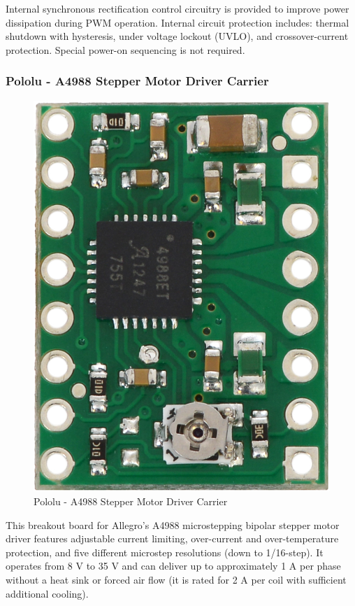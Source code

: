 Internal synchronous rectification control circuitry is provided to improve power dissipation during PWM operation. Internal circuit protection includes: thermal shutdown with hysteresis, under voltage lockout (UVLO), and crossover-current protection. Special power-on sequencing is not required\cite{A4988_allegro_thesis}.

\subsubsection{Pololu - A4988 Stepper Motor Driver Carrier}
\begin{figure}[H]
	\centering
	\includegraphics[width=\maxwidth{8cm}, keepaspectratio]{Chapters/Fig/pololu_A4988.jpg}
	\caption{Pololu - A4988 Stepper Motor Driver Carrier}
	\label{fig:pololu_A4988}
\end{figure}
This breakout board for Allegro's A4988 microstepping bipolar stepper motor driver features adjustable current limiting, over-current and over-temperature protection, and five different microstep resolutions (down to 1/16-step). It operates from 8 V to 35 V and can deliver up to approximately 1 A per phase without a heat sink or forced air flow (it is rated for 2 A per coil with sufficient additional cooling).
